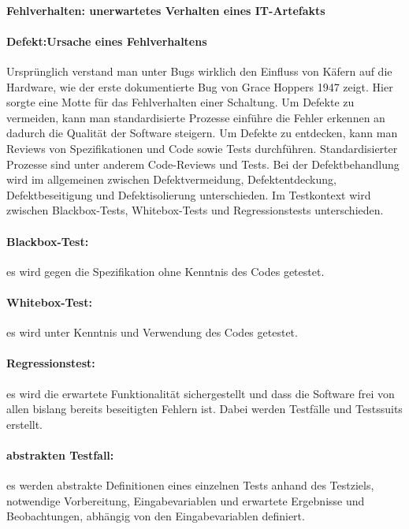 \paragraph{Fehlverhalten: unerwartetes Verhalten eines IT-Artefakts}
\paragraph{Defekt:Ursache eines Fehlverhaltens}

Ursprünglich verstand man unter Bugs wirklich den Einfluss von Käfern auf die Hardware, wie der erste dokumentierte Bug von Grace Hoppers 1947 zeigt. Hier sorgte eine Motte für das Fehlverhalten einer Schaltung.
\linebreak
Um Defekte zu vermeiden, kann man standardisierte Prozesse einführe die Fehler erkennen an dadurch die Qualität der Software steigern.
Um Defekte zu entdecken, kann man Reviews von Spezifikationen und Code sowie Tests durchführen.
Standardisierter Prozesse sind unter anderem Code-Reviews und Tests. Bei der Defektbehandlung wird im allgemeinen zwischen Defektvermeidung, Defektentdeckung, Defektbeseitigung und Defektisolierung unterschieden.
\linebreak
Im Testkontext wird zwischen Blackbox-Tests, Whitebox-Tests und Regressionstests unterschieden. 

\paragraph{Blackbox-Test:} es wird gegen die Spezifikation ohne Kenntnis des Codes getestet.
\paragraph{Whitebox-Test:} es wird unter Kenntnis und Verwendung des Codes getestet.
\paragraph{Regressionstest:} es wird die erwartete Funktionalität sichergestellt und dass die Software frei von allen bislang bereits beseitigten Fehlern ist.
\linebreak
Dabei werden Testfälle und Testssuits erstellt.
\paragraph{abstrakten Testfall:} es werden abstrakte Definitionen eines einzelnen Tests anhand des Testziels, notwendige Vorbereitung, Eingabevariablen und erwartete Ergebnisse und Beobachtungen, abhängig von den Eingabevariablen definiert.

